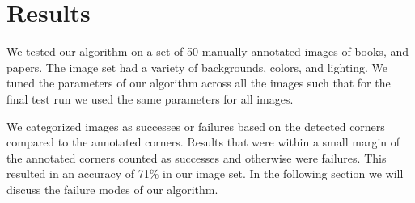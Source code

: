 \section{Results}
\label{sec:results}
We tested our algorithm on a set of 50 manually annotated images of books, and papers.
The image set had a variety of backgrounds, colors, and lighting.
We tuned the parameters of our algorithm across all the images such that for the final test run we used the same parameters for all images.

We categorized images as successes or failures based on the detected corners compared to the annotated corners.
Results that were within a small margin of the annotated corners counted as successes and otherwise were failures.
This resulted in an accuracy of 71\% in our image set.
In the following section we will discuss the failure modes of our algorithm.
